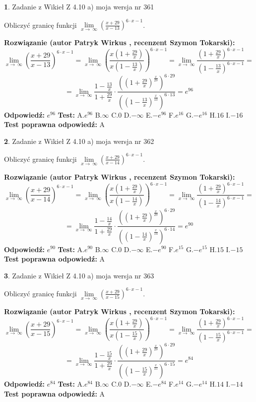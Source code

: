 \documentclass[12pt, a4paper]{article}
\theoremstyle{definition} %
\newtheorem{zad}{}
\newcommand{\zadStart}[1]{\begin{zad}#1\newline}
\newcommand{\zadStop}{\end{zad}}
\newcommand{\rozwStart}[2]{\noindent \textbf{Rozwiązanie (autor #1 , recenzent #2): }\newline}
\newcommand{\rozwStop}{\newline}
\newcommand{\odpStart}{\noindent \textbf{Odpowiedź:}\newline}
\newcommand{\odpStop}{\newline}
\newcommand{\testStart}{\noindent \textbf{Test:}\newline}
\newcommand{\testStop}{\newline}
\newcommand{\kluczStart}{\noindent \textbf{Test poprawna odpowiedź:}\newline}
\newcommand{\kluczStop}{\newline}
\begin{document}
\zadStart{Zadanie z Wikieł Z 4.10 a) moja wersja nr 361}

Obliczyć granicę funkcji  $\lim\limits_{x\to\ \infty}(\frac{x+29}{x-13})^{6\cdot x-1}$.
\zadStop
\rozwStart{Patryk Wirkus}{Szymon Tokarski}
$$\lim\limits_{x\to\ \infty}(\frac{x+29}{x-13})^{6\cdot x-1} = \lim\limits_{x\to\ \infty}(\frac{x(1+\frac{29}{x})}{x(1-\frac{13}{x})})^{6\cdot x-1}=\lim\limits_{x\to\ \infty}\frac{(1+\frac{29}{x})^{6\cdot x-1}}{(1-\frac{13}{x})^{6\cdot x-1}}=$$
$$=\lim\limits_{x\to\ \infty}\frac{1-\frac{13}{x}}{1+\frac{29}{x}}\cdot\frac{((1+\frac{29}{x})^{\frac{x}{29}})^{6\cdot29}}{((1-\frac{13}{x})^{\frac{x}{13}})^{6\cdot13}}=e^{96}$$
\rozwStop
\odpStart
$e^{96}$
\odpStop
\testStart
A.$e^{96}$ B.$\infty$ C.$0$ D.$-\infty$ E.$-e^{96}$
F.$e^{16}$ G.$-e^{16}$
H.$16$
I.$-16$
\testStop
\kluczStart
A
\kluczStop



\zadStart{Zadanie z Wikieł Z 4.10 a) moja wersja nr 362}

Obliczyć granicę funkcji  $\lim\limits_{x\to\ \infty}(\frac{x+29}{x-14})^{6\cdot x-1}$.
\zadStop
\rozwStart{Patryk Wirkus}{Szymon Tokarski}
$$\lim\limits_{x\to\ \infty}(\frac{x+29}{x-14})^{6\cdot x-1} = \lim\limits_{x\to\ \infty}(\frac{x(1+\frac{29}{x})}{x(1-\frac{14}{x})})^{6\cdot x-1}=\lim\limits_{x\to\ \infty}\frac{(1+\frac{29}{x})^{6\cdot x-1}}{(1-\frac{14}{x})^{6\cdot x-1}}=$$
$$=\lim\limits_{x\to\ \infty}\frac{1-\frac{14}{x}}{1+\frac{29}{x}}\cdot\frac{((1+\frac{29}{x})^{\frac{x}{29}})^{6\cdot29}}{((1-\frac{14}{x})^{\frac{x}{14}})^{6\cdot14}}=e^{90}$$
\rozwStop
\odpStart
$e^{90}$
\odpStop
\testStart
A.$e^{90}$ B.$\infty$ C.$0$ D.$-\infty$ E.$-e^{90}$
F.$e^{15}$ G.$-e^{15}$
H.$15$
I.$-15$
\testStop
\kluczStart
A
\kluczStop



\zadStart{Zadanie z Wikieł Z 4.10 a) moja wersja nr 363}

Obliczyć granicę funkcji  $\lim\limits_{x\to\ \infty}(\frac{x+29}{x-15})^{6\cdot x-1}$.
\zadStop
\rozwStart{Patryk Wirkus}{Szymon Tokarski}
$$\lim\limits_{x\to\ \infty}(\frac{x+29}{x-15})^{6\cdot x-1} = \lim\limits_{x\to\ \infty}(\frac{x(1+\frac{29}{x})}{x(1-\frac{15}{x})})^{6\cdot x-1}=\lim\limits_{x\to\ \infty}\frac{(1+\frac{29}{x})^{6\cdot x-1}}{(1-\frac{15}{x})^{6\cdot x-1}}=$$
$$=\lim\limits_{x\to\ \infty}\frac{1-\frac{15}{x}}{1+\frac{29}{x}}\cdot\frac{((1+\frac{29}{x})^{\frac{x}{29}})^{6\cdot29}}{((1-\frac{15}{x})^{\frac{x}{15}})^{6\cdot15}}=e^{84}$$
\rozwStop
\odpStart
$e^{84}$
\odpStop
\testStart
A.$e^{84}$ B.$\infty$ C.$0$ D.$-\infty$ E.$-e^{84}$
F.$e^{14}$ G.$-e^{14}$
H.$14$
I.$-14$
\testStop
\kluczStart
A
\kluczStop
\end{document}
